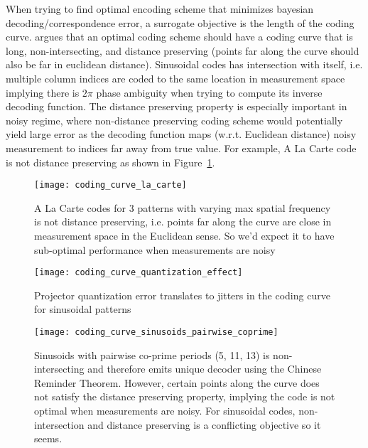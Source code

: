 \documentclass[../writeup.tex]{subfiles}
\begin{document}
When trying to find optimal encoding scheme that minimizes bayesian decoding/correspondence error, a surrogate objective is the length of the coding curve. \cite{guptaGeometricPerspectiveStructured2018} argues that an optimal coding scheme should have a coding curve that is long, non-intersecting, and distance preserving (points far along the curve should also be far in euclidean distance). Sinusoidal codes has intersection with itself, i.e. multiple column indices are coded to the same location in measurement space implying there is $2\pi$ phase ambiguity when trying to compute its inverse decoding function. The distance preserving property is especially important in noisy regime, where non-distance preserving coding scheme would potentially yield large error as the decoding function maps (w.r.t. Euclidean distance) noisy measurement to indices far away from true value. For example, A La Carte code is not distance preserving as shown in Figure~\ref{fig:coding_curve_la_carte}. 
\begin{figure}[h!] 
    \begin{center}
        \texttt{[image: coding\_curve\_la\_carte]}
        \caption{A La Carte codes for $3$ patterns with varying max spatial frequency \cite{mirdehghanOptimalStructuredLight2018} is not distance preserving, i.e. points far along the curve are close in measurement space in the Euclidean sense. So we'd expect it to have sub-optimal performance when measurements are noisy}
        \label{fig:coding_curve_la_carte}
    \end{center}
\end{figure}
\begin{figure}[h!]
    \begin{center}
        \texttt{[image: coding\_curve\_quantization\_effect]}
        \caption{Projector quantization error translates to jitters in the coding curve for sinusoidal patterns}
        \label{fig:coding_curve_quantization_effect}
    \end{center}
\end{figure}
\begin{figure}[h!]
    \begin{center}
        \texttt{[image: coding\_curve\_sinusoids\_pairwise\_coprime]}
        \caption{Sinusoids with pairwise co-prime periods (5, 11, 13) is non-intersecting and therefore emits unique decoder using the Chinese Reminder Theorem. However, certain points along the curve does not satisfy the distance preserving property, implying the code is not optimal when measurements are noisy. For sinusoidal codes, non-intersection and distance preserving is a conflicting objective so it seems.}
        \label{fig:coding_curve_sinusoids_pairwise_coprime}
    \end{center}
\end{figure}
\end{document}
